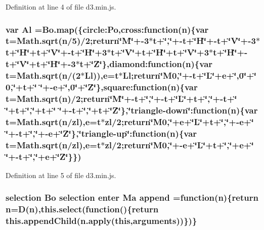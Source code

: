 Definition at line 4 of file d3.\+min.\+js.

\subsubsection[{Al}]{\setlength{\rightskip}{0pt plus 5cm}var Al ={\bf Bo.\+map}(\{circle\+:\+Po,cross\+:function({\bf n})\{var t={\bf Math.\+sqrt}({\bf n}/5)/2;{\bf return}\char`\"{}M\char`\"{}+-\/3$\ast$t+\char`\"{},\char`\"{}+-\/t+\char`\"{}H\char`\"{}+-\/t+\char`\"{}V\char`\"{}+-\/3$\ast$t+\char`\"{}H\char`\"{}+t+\char`\"{}V\char`\"{}+-\/t+\char`\"{}H\char`\"{}+3$\ast$t+\char`\"{}V\char`\"{}+t+\char`\"{}H\char`\"{}+t+\char`\"{}V\char`\"{}+3$\ast$t+\char`\"{}H\char`\"{}+-\/t+\char`\"{}V\char`\"{}+t+\char`\"{}H\char`\"{}+-\/3$\ast$t+\char`\"{}Z\char`\"{}\},diamond\+:function({\bf n})\{var t={\bf Math.\+sqrt}({\bf n}/(2$\ast${\bf Ll})),{\bf e}=t$\ast${\bf Ll};{\bf return}\char`\"{}M0,\char`\"{}+-\/t+\char`\"{}L\char`\"{}+e+\char`\"{},0\char`\"{}+\char`\"{} 0,\char`\"{}+t+\char`\"{} \char`\"{}+-\/{\bf e}+\char`\"{},0\char`\"{}+\char`\"{}Z\char`\"{}\},square\+:function({\bf n})\{var t={\bf Math.\+sqrt}({\bf n})/2;{\bf return}\char`\"{}M\char`\"{}+-\/t+\char`\"{},\char`\"{}+-\/t+\char`\"{}L\char`\"{}+t+\char`\"{},\char`\"{}+-\/t+\char`\"{} \char`\"{}+t+\char`\"{},\char`\"{}+t+\char`\"{} \char`\"{}+-\/t+\char`\"{},\char`\"{}+t+\char`\"{}Z\char`\"{}\},\char`\"{}triangle-\/down\char`\"{}\+:function({\bf n})\{var t={\bf Math.\+sqrt}({\bf n}/{\bf zl}),{\bf e}=t$\ast${\bf zl}/2;{\bf return}\char`\"{}M0,\char`\"{}+e+\char`\"{}L\char`\"{}+t+\char`\"{},\char`\"{}+-\/{\bf e}+\char`\"{} \char`\"{}+-\/t+\char`\"{},\char`\"{}+-\/{\bf e}+\char`\"{}Z\char`\"{}\},\char`\"{}triangle-\/up\char`\"{}\+:function({\bf n})\{var t={\bf Math.\+sqrt}({\bf n}/{\bf zl}),{\bf e}=t$\ast${\bf zl}/2;{\bf return}\char`\"{}M0,\char`\"{}+-\/e+\char`\"{}L\char`\"{}+t+\char`\"{},\char`\"{}+{\bf e}+\char`\"{} \char`\"{}+-\/t+\char`\"{},\char`\"{}+{\bf e}+\char`\"{}Z\char`\"{}\}\})}\label{d3_8min_8js_a016283de43a259547ebb54443e366f72}


Definition at line 5 of file d3.\+min.\+js.

\subsubsection[{append}]{ {\bf selection} {\bf Bo} {\bf selection} {\bf enter} {\bf Ma} append =function({\bf n})\{{\bf return} {\bf n}=D({\bf n}),{\bf this.\+select}(function()\{{\bf return} this.\+append\+Child(n.\+apply({\bf this},arguments))\})\}}\label{d3_8min_8js_a65bc4853a78f3e06ae52555272954bed}


